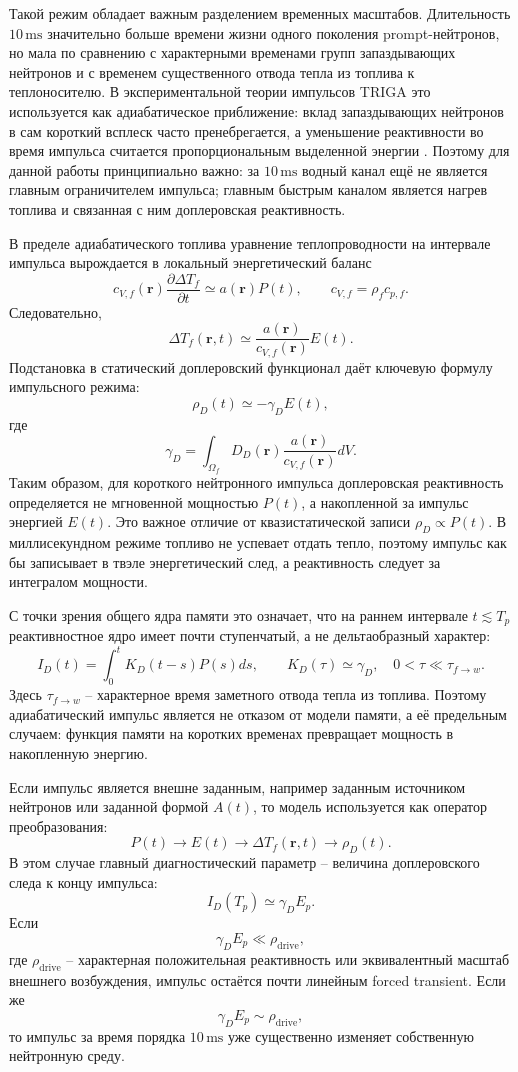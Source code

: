 \documentclass[12pt]{article}
\begin{document}
Такой режим обладает важным разделением временных масштабов. Длительность \(10\,\mathrm{ms}\) значительно больше времени жизни одного поколения prompt-нейтронов, но мала по сравнению с характерными временами групп запаздывающих нейтронов и с временем существенного отвода тепла из топлива к теплоносителю. В экспериментальной теории импульсов TRIGA это используется как адиабатическое приближение: вклад запаздывающих нейтронов в сам короткий всплеск часто пренебрегается, а уменьшение реактивности во время импульса считается пропорциональным выделенной энергии \cite{IAEATRIGAPulseExperiment,Svajger2024PulseExperiments}. Поэтому для данной работы принципиально важно: за \(10\,\mathrm{ms}\) водный канал ещё не является главным ограничителем импульса; главным быстрым каналом является нагрев топлива и связанная с ним доплеровская реактивность.

В пределе адиабатического топлива уравнение теплопроводности на интервале импульса вырождается в локальный энергетический баланс
\[
c_{V,f}(\mathbf r)\frac{\partial \Delta T_f}{\partial t}
\simeq
a(\mathbf r)P(t),
\qquad
c_{V,f}=\rho_fc_{p,f}.
\]
Следовательно,
\[
\Delta T_f(\mathbf r,t)
\simeq
\frac{a(\mathbf r)}{c_{V,f}(\mathbf r)}E(t).
\]
Подстановка в статический доплеровский функционал даёт ключевую формулу импульсного режима:
\[
\rho_D(t)
\simeq
-\gamma_D E(t),
\]
где
\[
\gamma_D=
\int_{\Omega_f}
D_D(\mathbf r)
\frac{a(\mathbf r)}{c_{V,f}(\mathbf r)}dV.
\]
Таким образом, для короткого нейтронного импульса доплеровская реактивность определяется не мгновенной мощностью \(P(t)\), а накопленной за импульс энергией \(E(t)\). Это важное отличие от квазистатической записи \(\rho_D\propto P(t)\). В миллисекундном режиме топливо не успевает отдать тепло, поэтому импульс как бы записывает в твэле энергетический след, а реактивность следует за интегралом мощности.

С точки зрения общего ядра памяти это означает, что на раннем интервале \(t\lesssim T_p\) реактивностное ядро имеет почти ступенчатый, а не дельтаобразный характер:
\[
I_D(t)=\int_0^tK_D(t-s)P(s)ds,
\qquad
K_D(\tau)\simeq \gamma_D,
\quad
0<\tau\ll \tau_{f\to w}.
\]
Здесь \(\tau_{f\to w}\) -- характерное время заметного отвода тепла из топлива. Поэтому адиабатический импульс является не отказом от модели памяти, а её предельным случаем: функция памяти на коротких временах превращает мощность в накопленную энергию.

Если импульс является внешне заданным, например заданным источником нейтронов или заданной формой \(A(t)\), то модель используется как оператор преобразования:
\[
P(t)\longrightarrow E(t)
\longrightarrow \Delta T_f(\mathbf r,t)
\longrightarrow \rho_D(t).
\]
В этом случае главный диагностический параметр -- величина доплеровского следа к концу импульса:
\[
I_D(T_p)\simeq \gamma_D E_p.
\]
Если
\[
\gamma_D E_p\ll \rho_{\mathrm{drive}},
\]
где \(\rho_{\mathrm{drive}}\) -- характерная положительная реактивность или эквивалентный масштаб внешнего возбуждения, импульс остаётся почти линейным forced transient. Если же
\[
\gamma_D E_p\sim \rho_{\mathrm{drive}},
\]
то импульс за время порядка \(10\,\mathrm{ms}\) уже существенно изменяет собственную нейтронную среду.
\end{document}
